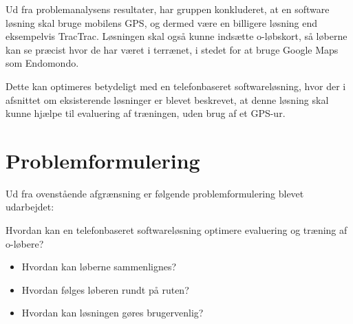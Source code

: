 Ud fra problemanalysens resultater, har gruppen konkluderet, at en software løsning skal bruge mobilens GPS, og dermed være en billigere løsning end eksempelvis TracTrac. Løsningen skal også kunne indsætte o-løbskort, så løberne kan se præcist hvor de har været i terrænet, i stedet for at bruge Google Maps som Endomondo. 

Dette kan optimeres betydeligt med en telefonbaseret softwareløsning, hvor der i afsnittet om eksisterende løsninger er blevet beskrevet, at denne løsning skal kunne hjælpe til evaluering af træningen, uden brug af et GPS-ur.

\section{Problemformulering}
Ud fra ovenstående afgrænsning er følgende problemformulering blevet udarbejdet:

Hvordan kan en telefonbaseret softwareløsning optimere evaluering og træning af o-løbere?
\begin{itemize}
	\item Hvordan kan løberne sammenlignes?
	\item Hvordan følges løberen rundt på ruten?
	\item Hvordan kan løsningen gøres brugervenlig?
\end{itemize}